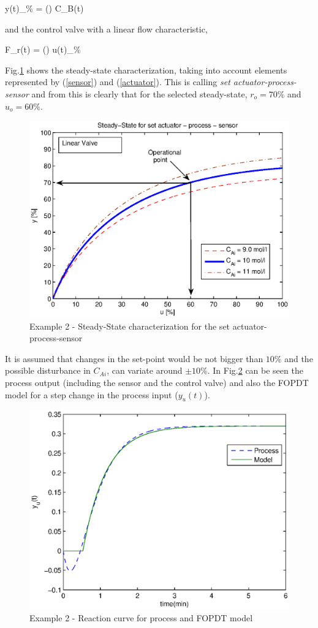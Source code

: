 \be
    y(t)_{\%} = \left(\right) C_B(t) \label{sensor}
\ee

\noindent and the control valve with a linear flow characteristic,

\be
    F_r(t) = \left(\right) u(t)_{\%} \label{actuator}
\ee

Fig.\ref{c_estatica2} shows the steady-state characterization,
taking into account elements represented by (\ref{sensor}) and
(\ref{actuator}). This is calling \emph{set
actuator-process-sensor} and from this is clearly that for the
selected steady-state, $r_o = 70 \%$ and $u_o = 60 \%$.

\begin{figure}[htb!]
    \begin{center}
        \includegraphics[width=0.7\linewidth]{c_estatica2.eps}
        \caption{Example 2 - Steady-State characterization for the set actuator-process-sensor}
        \label{c_estatica2}
    \end{center}
\end{figure}

It is assumed that changes in the set-point would be not bigger
than $10 \%$ and the possible disturbance in $C_{Ai}$, can variate
around $\pm 10 \%$. In Fig.\ref{process} can be seen the process
output (including the sensor and the control valve) and also the
FOPDT model for a step change in the process input ($y_u(t)$).

\begin{figure}[htb!]
    \begin{center}
        \includegraphics[width=0.7\linewidth]{FOPDT.eps}
       \caption{Example 2 - Reaction curve for process and FOPDT model} \label{process}
    \end{center}
\end{figure}

